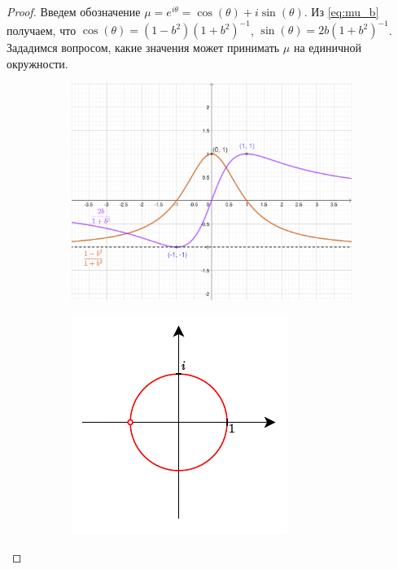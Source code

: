 \documentclass{article}
\newtheorem*{proof}{$\square$}
\begin{document}
\begin{proof}
		Введем обозначение $\mu = e^{i\theta} = \cos(\theta) + i \sin(\theta)$. Из \eqref{eq:mu_b} получаем, что $\cos(\theta) = (1-b^2)(1+b^2)^{-1}$, $\sin(\theta) = 2b (1+b^2)^{-1}$. Зададимся вопросом, какие значения может принимать $\mu$ на единичной окружности.
 		
		\begin{figure}[h!]
			\centering
			\begin{subfigure}[h]{0.45\linewidth}
				\centering
				\includegraphics[width=\linewidth]{figures/mu_sin_cos}
			\end{subfigure}
			\hfill
			\begin{subfigure}[h]{0.35\linewidth}
				\centering
				\includegraphics[width=\linewidth]{figures/muQ}
			\end{subfigure}
		\end{figure}
		

\end{proof}
\end{document}
